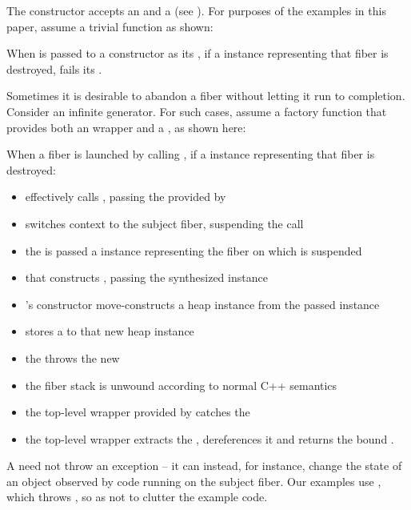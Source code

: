 
The \fiber constructor accepts an \entryfn and a \cancelfn (see
). For purposes of the examples in this paper, assume a
trivial  function as shown:


When  is passed to a \fiber constructor as its \cancelfn,
if a \fiber instance representing that fiber is destroyed,
 fails its .

Sometimes it is desirable to abandon a fiber without letting it run to
completion. Consider an infinite generator. For such cases, assume a
 factory function that provides both an \entryfn wrapper and a
\cancelfn, as shown here:


When a fiber is launched by calling , if a \fiber instance
representing that fiber is destroyed:

\begin{itemize}
    \item {} effectively calls \xtresumewith, passing
          the \cancelfn provided by 
    \item \xtresumewith switches context to the subject fiber, suspending the
           call
    \item the \cancelfn is passed a \fiber instance representing the fiber on
          which  is suspended
    \item that \cancelfn constructs , passing the
          synthesized \fiber instance
    \item {}'s constructor move-constructs a heap \fiber
          instance from the passed \fiber instance
    \item {} stores a  to that new
          heap \fiber instance
    \item the \cancelfn throws the new 
    \item the fiber stack is unwound according to normal C++ semantics
    \item the top-level wrapper provided by  catches the
    \item the top-level wrapper extracts the , dereferences
          it and returns the bound \fiber.
\end{itemize}

A \cancelfn need not throw an exception -- it can instead, for instance,
change the state of an object observed by code running on the subject fiber.
Our examples use , which throws , so as
not to clutter the example code.
